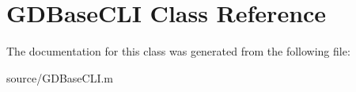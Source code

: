 \hypertarget{class_g_d_base_c_l_i}{
\section{GDBaseCLI Class Reference}
\label{class_g_d_base_c_l_i}
}


The documentation for this class was generated from the following file:\begin{DoxyCompactItemize}
\item 
source/GDBaseCLI.m\end{DoxyCompactItemize}
